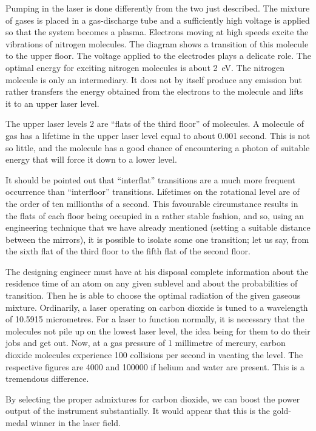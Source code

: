 Pumping in the  laser is done differently from the two just described. The mixture of gases is placed in a gas-discharge tube and a sufficiently high voltage is applied so that the system becomes a plasma. Electrons moving at high speeds excite the vibrations of nitrogen molecules. The diagram shows a transition of this molecule to the upper floor. The voltage applied to the electrodes plays a delicate role. The optimal energy for exciting nitrogen molecules is about \SI{2}{\electronvolt}. The nitrogen molecule is only an intermediary. It does not by itself produce any emission but rather transfers the energy obtained from the electrons to the  molecule and lifts it to an upper laser level.

The upper laser levels 2 are ``flats of the third floor'' of  molecules. A molecule of gas has a lifetime in the upper laser level equal to about 0.001 second. This is not so little, and the molecule has a good chance of encountering a photon of suitable energy that will force it down to a lower level.

It should be pointed out that ``interflat'' transitions are a much more frequent occurrence than ``interfloor'' transitions. Lifetimes on the rotational level are of the order of ten millionths of a second. This favourable circumstance results in the flats of each floor being occupied in a rather stable fashion, and so, using an engineering technique that we have already mentioned (setting a suitable distance between the mirrors), it is possible to isolate some one transition; let us say, from the sixth flat of the third floor to the fifth flat of the second floor.

The designing engineer must have at his disposal complete information about the residence time of an atom on any given sublevel and about the probabilities of transition. Then he is able to choose the optimal radiation of the given gaseous mixture. Ordinarily, a laser operating on carbon dioxide is tuned to a wavelength of \num{10.5915} micrometres. For a laser to function normally, it is necessary that the molecules not pile up on the lowest laser level, the idea being for them to do their jobs and get out. Now, at a gas pressure of 1 millimetre of mercury, carbon dioxide molecules experience 100 collisions per second in vacating the level. The respective figures are \num{4000} and \num{100000} if helium and water are present. This is a tremendous difference.

By selecting the proper admixtures for carbon dioxide, we can boost the power output of the instrument substantially. It would appear that this is the gold-medal winner in the laser field.

